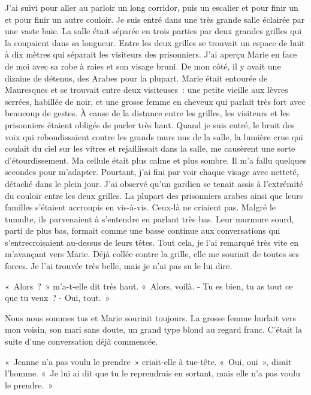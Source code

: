 \documentclass[french,twoside]{book} %
\begin{document}
J'ai suivi pour aller au parloir un long corridor, puis un escalier et pour finir un et pour finir un autre couloir. Je suis entré dans une très grande salle éclairée par une vaste baie. La salle était séparée en trois parties par deux grandes grilles qui la coupaient dans sa longueur. Entre les deux grilles se trouvait un espace de huit à dix mètres qui séparait les visiteurs des prisonniers. J'ai aperçu Marie en face de moi avec sa robe à raies et son visage bruni. De mon côté, il y avait une dizaine de détenus, des Arabes pour la plupart. Marie était entourée de Mauresques et se trouvait entre deux visiteuses : une petite vieille aux lèvres serrées, habillée de noir, et une grosse femme en cheveux qui parlait très fort avec beaucoup de gestes. À cause de la distance entre les grilles, les visiteurs et les prisonniers étaient obligés de parler très haut. Quand je suis entré, le bruit des voix qui rebondissaient contre les grands murs nus de la salle, la lumière crue qui coulait du ciel sur les vitres et rejaillissait dans la salle, me causèrent une sorte d’étourdissement. Ma cellule était plus calme et plus sombre. Il m’a fallu quelques secondes pour m’adapter. Pourtant, j’ai fini par voir chaque visage avec netteté, détaché dans le plein jour. J'ai observé qu’un gardien se tenait assis à l’extrémité du couloir entre les deux grilles. La plupart des prisonniers arabes ainsi que leurs familles s’étaient accroupis en vis-à-vis. Ceux-là ne criaient pas. Malgré le tumulte, ils parvenaient à s’entendre en parlant très bas. Leur murmure sourd, parti de plus bas, formait comme une basse continue aux conversations qui s’entrecroisaient au-dessus de leurs têtes. Tout cela, je l’ai remarqué très vite en m’avançant vers Marie. Déjà collée contre la grille, elle me souriait de toutes ses forces. Je l’ai trouvée très belle, mais je n’ai pas su le lui dire.\par
« Alors ? » m’a-t-elle dit très haut. « Alors, voilà. - Tu es bien, tu as tout ce que tu veux ? - Oui, tout. »\par
Nous nous sommes tus et Marie souriait toujours. La grosse femme hurlait vers mon voisin, son mari sans doute, un grand type blond au regard franc. C'était la suite d’une conversation déjà commencée.\par
« Jeanne n’a pas voulu le prendre » criait-elle à tue-tête. « Oui, oui », disait l’homme. « Je lui ai dit que tu le reprendrais en sortant, mais elle n’a pas voulu le prendre. »\par
\end{document}
